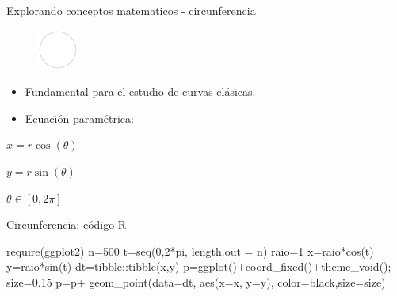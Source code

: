 \documentclass[
  ignorenonframetext,
]{beamer}
\newenvironment{Shaded}{\begin{snugshade}}{\end{snugshade}}
\newcommand{\AttributeTok}[1]{\textcolor[rgb]{0.40,0.45,0.13}{#1}}
\newcommand{\DecValTok}[1]{\textcolor[rgb]{0.68,0.00,0.00}{#1}}
\newcommand{\FloatTok}[1]{\textcolor[rgb]{0.68,0.00,0.00}{#1}}
\newcommand{\FunctionTok}[1]{\textcolor[rgb]{0.28,0.35,0.67}{#1}}
\newcommand{\NormalTok}[1]{\textcolor[rgb]{0.00,0.23,0.31}{#1}}
\newcommand{\OtherTok}[1]{\textcolor[rgb]{0.00,0.23,0.31}{#1}}
\newcommand{\SpecialCharTok}[1]{\textcolor[rgb]{0.37,0.37,0.37}{#1}}
\newcommand{\StringTok}[1]{\textcolor[rgb]{0.13,0.47,0.30}{#1}}
\begin{document}
\begin{frame}{Explorando conceptos matematicos - circunferencia}
\protect\hypertarget{explorando-conceptos-matematicos---circunferencia}{}
\begin{figure}

{\centering \includegraphics[width=0.52083in,height=\textheight]{FigurasLatinR2023/Circulo.png}

}

\end{figure}

\begin{itemize}
\item
  Fundamental para el estudio de curvas clásicas.
\item
  Ecuación paramétrica:
\end{itemize}

\(x=r\cos(\theta)\)

\(y=r\sin(\theta)\)

\(\theta\in [0,2\pi]\)
\end{frame}

\begin{frame}[fragile]{Circunferencia: código R}
\protect\hypertarget{circunferencia-cuxf3digo-r}{}
\begin{Shaded}
\begin{Highlighting}[]
    \FunctionTok{require}\NormalTok{(ggplot2)}
\NormalTok{    n}\OtherTok{=}\DecValTok{500}
\NormalTok{    t}\OtherTok{=}\FunctionTok{seq}\NormalTok{(}\DecValTok{0}\NormalTok{,}\DecValTok{2}\SpecialCharTok{*}\NormalTok{pi, }\AttributeTok{length.out =}\NormalTok{ n)}
\NormalTok{    raio}\OtherTok{=}\DecValTok{1}
\NormalTok{    x}\OtherTok{=}\NormalTok{raio}\SpecialCharTok{*}\FunctionTok{cos}\NormalTok{(t)}
\NormalTok{    y}\OtherTok{=}\NormalTok{raio}\SpecialCharTok{*}\FunctionTok{sin}\NormalTok{(t)}
\NormalTok{    dt}\OtherTok{=}\NormalTok{tibble}\SpecialCharTok{::}\FunctionTok{tibble}\NormalTok{(x,y)}
\NormalTok{    p}\OtherTok{=}\FunctionTok{ggplot}\NormalTok{()}\SpecialCharTok{+}\FunctionTok{coord\_fixed}\NormalTok{()}\SpecialCharTok{+}\FunctionTok{theme\_void}\NormalTok{();}
\NormalTok{    size}\OtherTok{=}\FloatTok{0.15}
\NormalTok{    p}\OtherTok{=}\NormalTok{p}\SpecialCharTok{+} \FunctionTok{geom\_point}\NormalTok{(}\AttributeTok{data=}\NormalTok{dt, }\FunctionTok{aes}\NormalTok{(}\AttributeTok{x=}\NormalTok{x, }\AttributeTok{y=}\NormalTok{y),}
                    \AttributeTok{color=}\StringTok{\textquotesingle{}black\textquotesingle{}}\NormalTok{,}\AttributeTok{size=}\NormalTok{size)}
\end{Highlighting}
\end{Shaded}
\end{frame}
\end{document}
